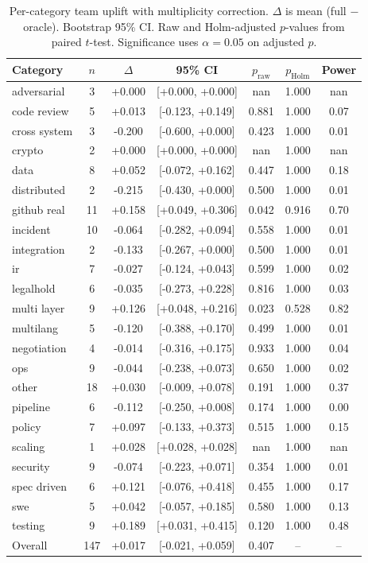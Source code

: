 \begin{table}[h]\centering\small
\caption{Per-category team uplift with multiplicity correction. $\Delta$ is mean (full $-$ oracle). Bootstrap 95\% CI. Raw and Holm-adjusted $p$-values from paired $t$-test. Significance uses $\alpha=0.05$ on adjusted $p$.}
\label{tab:stat_rigor}
\begin{tabular}{lcccccc}\toprule
Category & $n$ & $\Delta$ & 95\% CI & $p_{\text{raw}}$ & $p_{\text{Holm}}$ & Power \\ \midrule
adversarial & 3 & +0.000 & [+0.000, +0.000] & nan & 1.000 & nan \\
code review & 5 & +0.013 & [-0.123, +0.149] & 0.881 & 1.000 & 0.07 \\
cross system & 3 & -0.200 & [-0.600, +0.000] & 0.423 & 1.000 & 0.01 \\
crypto & 2 & +0.000 & [+0.000, +0.000] & nan & 1.000 & nan \\
data & 8 & +0.052 & [-0.072, +0.162] & 0.447 & 1.000 & 0.18 \\
distributed & 2 & -0.215 & [-0.430, +0.000] & 0.500 & 1.000 & 0.01 \\
github real & 11 & +0.158 & [+0.049, +0.306] & 0.042 & 0.916 & 0.70 \\
incident & 10 & -0.064 & [-0.282, +0.094] & 0.558 & 1.000 & 0.01 \\
integration & 2 & -0.133 & [-0.267, +0.000] & 0.500 & 1.000 & 0.01 \\
ir & 7 & -0.027 & [-0.124, +0.043] & 0.599 & 1.000 & 0.02 \\
legalhold & 6 & -0.035 & [-0.273, +0.228] & 0.816 & 1.000 & 0.03 \\
multi layer & 9 & +0.126 & [+0.048, +0.216] & 0.023 & 0.528 & 0.82 \\
multilang & 5 & -0.120 & [-0.388, +0.170] & 0.499 & 1.000 & 0.01 \\
negotiation & 4 & -0.014 & [-0.316, +0.175] & 0.933 & 1.000 & 0.04 \\
ops & 9 & -0.044 & [-0.238, +0.073] & 0.650 & 1.000 & 0.02 \\
other & 18 & +0.030 & [-0.009, +0.078] & 0.191 & 1.000 & 0.37 \\
pipeline & 6 & -0.112 & [-0.250, +0.008] & 0.174 & 1.000 & 0.00 \\
policy & 7 & +0.097 & [-0.133, +0.373] & 0.515 & 1.000 & 0.15 \\
scaling & 1 & +0.028 & [+0.028, +0.028] & nan & 1.000 & nan \\
security & 9 & -0.074 & [-0.223, +0.071] & 0.354 & 1.000 & 0.01 \\
spec driven & 6 & +0.121 & [-0.076, +0.418] & 0.455 & 1.000 & 0.17 \\
swe & 5 & +0.042 & [-0.057, +0.185] & 0.580 & 1.000 & 0.13 \\
testing & 9 & +0.189 & [+0.031, +0.415] & 0.120 & 1.000 & 0.48 \\
\midrule
Overall & 147 & +0.017 & [-0.021, +0.059] & 0.407 & -- & -- \\
\bottomrule\end{tabular}\end{table}